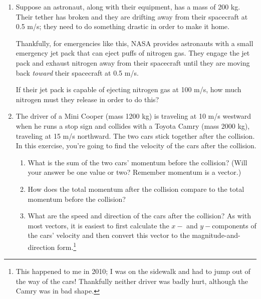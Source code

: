 \documentclass[12pt]{article}
\begin{document}
\newpage

\begin{enumerate}
	
	\item Suppose an astronaut, along with their equipment, has a mass of 200 kg. Their tether has broken and they are drifting away from their spacecraft at 0.5 m/s; they need to do something drastic in order to make it home.
	
	Thankfully, for emergencies like this, NASA provides astronauts with a small emergency jet pack that can eject puffs of nitrogen gas. They engage the jet pack and exhaust nitrogen away from their spacecraft until they are moving back {\it toward} their spacecraft at 0.5 m/s.
	
	If their jet pack is capable of ejecting nitrogen gas at 100 m/s, how much nitrogen must they release in order to do this?
	

		\newpage
		
		\item{The driver of a Mini Cooper (mass 1200 kg) is traveling at 10 m/s westward when he runs a stop sign and collides with a Toyota Camry (mass 2000 kg), traveling at 15 m/s northward. The two cars stick together after the collision. In this exercise, you're going to find the velocity of the cars after the collision.}
		
		\vspace{2in}
		
		
		\begin{enumerate}
			\item What is the sum of the two cars' momentum before the collision? (Will your answer be one value or two? Remember momentum is a vector.)
			
			\vspace{2.5in}
			
			\item How does the total momentum after the collision compare to the total momentum before the collision?
			
			\newpage
			
			\vspace{2.5in}
			\item{What are the speed and direction of the cars after the collision? As with most vectors, it is easiest to first calculate the $x-$ and $y-$components of the cars' velocity and then convert this vector to the magnitude-and-direction form.\footnote{This happened to me in 2010; I was on the sidewalk and had to jump out of the way of the cars! Thankfully neither driver was badly hurt, although the Camry was in bad shape.}}
			

\end{enumerate}
\end{enumerate}
\end{document}

